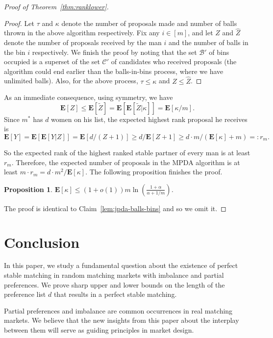 \documentclass[11pt]{amsart}
\newtheorem{proposition}[theorem]{Proposition}
\newcommand{\cal}[1]{\mathcal{#1}}
\begin{document}
\begin{proof}[Proof of Theorem~\ref{thm:ranklower}]
\begin{proof}
Let $\tau$ and $\kappa$ denote the number of proposals made and number of balls thrown in the above algorithm respectively. Fix any $i \in [m]$, and let $Z$ and $\hat{Z}$ denote the number of proposals received by the man $i$ and the number of balls in the bin $i$ respectively. We finish the proof by noting that the set $\cal{B}'$ of bins occupied is a superset of the set $\cal{C}'$ of candidates who received proposals (the algorithm could end earlier than the balls-in-bins process, where we have unlimited balls). Also, for the above process, $\tau \leq \kappa$ and $Z \leq \hat{Z}$.
\end{proof}
As an immediate consequence, using symmetry, we have
\[
\mathbf{E}[Z] \leq \mathbf{E}[\tilde{Z}] = \mathbf{E}[\mathbf{E}[\tilde{Z}|\kappa]] = \mathbf{E}[\kappa/m].
\]
Since $m^*$  has $d$ women on his list, the expected highest rank proposal he receives is 
\[\mathbf{E}[Y] = \mathbf{E}\left[\mathbf{E}[Y|Z]\right] = \mathbf{E}[d/(Z+1)] \geq d/\mathbf{E}[Z+1] \geq d\cdot m / (\mathbf{E}[\kappa] + m) =: r_m.\]

So the expected rank of the highest ranked stable partner of every man is at least $r_m$. Therefore, the expected number of proposals in the MPDA algorithm is at least $m \cdot r_m = d\cdot m^2/\mathbf{E}[\kappa]$. The following proposition finishes the proof.

\begin{proposition}
$\mathbf{E}[\kappa] \leq (1 + o(1))m\ln(\frac{1 + \alpha}{\alpha + 1/m})$.
\end{proposition}

The proof is identical to Claim~\ref{lem:jpda-balls-bins} and so we omit it.
\end{proof}






 \section{Conclusion}\label{sec:conclusion}
In this paper, we study a fundamental question about the existence of perfect stable matching in random matching markets with imbalance and partial preferences.  We prove sharp upper and lower bounds on the length of the preference list $d$ that results in a perfect stable matching.  



Partial preferences and imbalance are common occurrences in real matching markets.
We believe that the new insights from this paper about the interplay between them will serve as guiding principles in market design.
\end{document}
